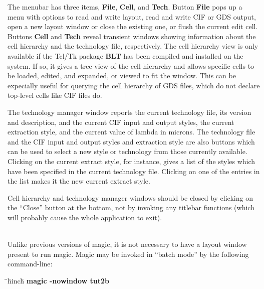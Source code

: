 \documentclass[letterpaper,twoside,12pt]{article}
\def\hinch{\hspace*{0.5in}}
\def\starti{\begin{center}\begin{tabbing}\hinch\=\hinch\=\hinch\=hinch\hinch\=\kill}
\def\endi{\end{tabbing}\end{center}}
\def\ii{\>\>\>}
\begin{document}
The menubar has three items, {\bfseries File}, {\bfseries Cell}, and
{\bfseries Tech}.  Button {\bfseries File} pops up a menu with options
to read and write layout, read and write CIF or GDS output, open a new
layout window or close the existing one, or flush the current edit cell.
Buttons {\bfseries Cell} and {\bfseries Tech} reveal transient windows
showing information about the cell hierarchy and the technology file,
respectively.  The cell hierarchy view is only available if the Tcl/Tk
package {\bfseries BLT} has been compiled and installed on the system.
If so, it gives a tree view of the cell hierarchy and allows specific
cells to be loaded, edited, and expanded, or viewed to fit the window.
This can be expecially useful for querying the cell hierarchy of GDS
files, which do not declare top-level cells like CIF files do.

The technology manager window reports the current technology file, its
version and description, and the current CIF input and output styles,
the current extraction style, and the current value of lambda in microns.
The technology file and the CIF input and output styles and extraction
style are also buttons which can be used to select a new style or technology
from those currently available.  Clicking on the current extract style, for
instance, gives a list of the styles which have been specified in the
current technology file.  Clicking on one of the entries in the list makes
it the new current extract style.

Cell hierarchy and technology manager windows should be closed by clicking
on the ``Close'' button at the bottom, not by invoking any titlebar functions
(which will probably cause the whole application to exit).

\medskip
{} \\

Unlike previous versions of magic, it is not necessary to have a layout
window present to run magic.  Magic may be invoked in ``batch mode'' by
the following command-line:
\starti
   \ii {\itshape \#} {\bfseries magic -nowindow tut2b} \\
\endi
\end{document}
